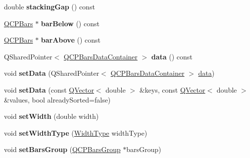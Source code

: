 \begin{DoxyCompactItemize}
\mbox{\label{class_q_c_p_bars_a2e6192fa9c16df7ba94cd50c0c9ec7ce}} 
double {\bfseries stacking\+Gap} () const
\item 
\mbox{\label{class_q_c_p_bars_a6f67591bee1e04b148b8e0d5f863fb18}} 
\hyperlink{class_q_c_p_bars}{Q\+C\+P\+Bars} $\ast$ {\bfseries bar\+Below} () const
\item 
\mbox{\label{class_q_c_p_bars_a0233faa5373e53c561ecd612cfecb105}} 
\hyperlink{class_q_c_p_bars}{Q\+C\+P\+Bars} $\ast$ {\bfseries bar\+Above} () const
\item 
\mbox{\label{class_q_c_p_bars_ad93c45091486e3fb9a13ddd937209299}} 
Q\+Shared\+Pointer$<$ \hyperlink{class_q_c_p_data_container}{Q\+C\+P\+Bars\+Data\+Container} $>$ {\bfseries data} () const
\item 
\mbox{\label{class_q_c_p_bars_a6dc562ec7120a8521e1061f2134367e4}} 
void {\bfseries set\+Data} (Q\+Shared\+Pointer$<$ \hyperlink{class_q_c_p_data_container}{Q\+C\+P\+Bars\+Data\+Container} $>$ \hyperlink{class_q_c_p_bars_a7e373a534d82e18ed27b3fafd1f08fae}{data})
\item 
\mbox{\label{class_q_c_p_bars_a2a88cd5b16ec7b71e5a590f95b50c5ce}} 
void {\bfseries set\+Data} (const \hyperlink{class_q_vector}{Q\+Vector}$<$ double $>$ \&keys, const \hyperlink{class_q_vector}{Q\+Vector}$<$ double $>$ \&values, bool already\+Sorted=false)
\item 
\mbox{\label{class_q_c_p_bars_afec6116579d44d5b706e0fa5e5332507}} 
void {\bfseries set\+Width} (double width)
\item 
\mbox{\label{class_q_c_p_bars_adcaa3b41281bb2c0f7949b341592fcc0}} 
void {\bfseries set\+Width\+Type} (\hyperlink{class_q_c_p_bars_a65dbbf1ab41cbe993d71521096ed4649}{Width\+Type} width\+Type)
\item 
\mbox{\label{class_q_c_p_bars_aedd1709061f0b307c47ddb45e172ef9a}} 
void {\bfseries set\+Bars\+Group} (\hyperlink{class_q_c_p_bars_group}{Q\+C\+P\+Bars\+Group} $\ast$bars\+Group)
\item 
\mbox{\label{class_q_c_p_bars_a574ec7eb7537566df1a28ff085d75623}} 

\end{DoxyCompactItemize}
